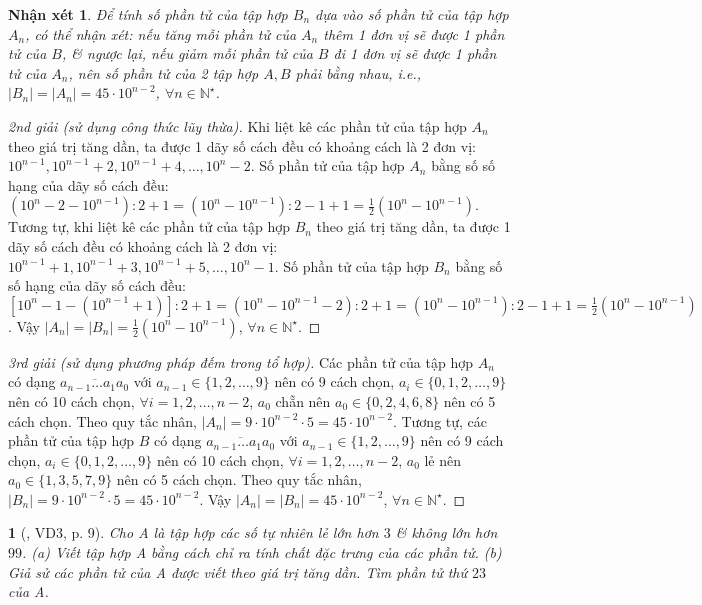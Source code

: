\documentclass{article}
\newtheorem{baitoan}{}
\newtheorem{nhanxet}{Nhận xét}
\begin{document}
\begin{nhanxet}
	Để tính số phần tử của tập hợp $B_n$ dựa vào số phần tử của tập hợp $A_n$, có thể nhận xét: nếu tăng mỗi phần tử của $A_n$ thêm 1 đơn vị sẽ được 1 phần tử của $B$, \& ngược lại, nếu giảm mỗi phần tử của $B$ đi 1 đơn vị sẽ được 1 phần tử của $A_n$, nên số phần tử của 2 tập hợp $A,B$ phải bằng nhau, i.e., $|B_n| = |A_n| = 45\cdot10^{n-2}$, $\forall n\in\mathbb{N}^\star$.
\end{nhanxet}

\begin{proof}[2nd giải (sử dụng công thức lũy thừa)]
	Khi liệt kê các phần tử của tập hợp $A_n$ theo giá trị tăng dần, ta được 1 dãy số cách đều có khoảng cách là 2 đơn vị: $10^{n-1},10^{n-1} + 2,10^{n-1} + 4,\ldots,10^n - 2$. Số phần tử của tập hợp $A_n$ bằng số số hạng của dãy số cách đều: $(10^n - 2 - 10^{n-1}):2 + 1 = (10^n - 10^{n-1}):2 - 1 + 1 = \frac{1}{2}(10^n - 10^{n-1})$. Tương tự, khi liệt kê các phần tử của tập hợp $B_n$ theo giá trị tăng dần, ta được 1 dãy số cách đều có khoảng cách là 2 đơn vị: $10^{n-1} + 1,10^{n-1} + 3,10^{n-1} + 5,\ldots,10^n - 1$. Số phần tử của tập hợp $B_n$ bằng số số hạng của dãy số cách đều: $[10^n - 1 - (10^{n-1} + 1)]:2 + 1 = (10^n - 10^{n-1} - 2):2 + 1 = (10^n - 10^{n-1}):2 - 1 + 1 = \frac{1}{2}(10^n - 10^{n-1})$. Vậy $|A_n| = |B_n| = \frac{1}{2}(10^n - 10^{n-1})$, $\forall n\in\mathbb{N}^\star$.
\end{proof}

\begin{proof}[3rd giải (sử dụng phương pháp đếm trong tổ hợp)]
	Các phần tử của tập hợp $A_n$ có dạng $\overline{a_{n-1}\ldots a_1a_0}$ với $a_{n-1}\in\{1,2,\ldots,9\}$ nên có 9 cách chọn, $a_i\in\{0,1,2,\ldots,9\}$ nên có 10 cách chọn, $\forall i = 1,2,\ldots,n - 2$, $a_0$ chẵn nên $a_0\in\{0,2,4,6,8\}$ nên có 5 cách chọn. Theo quy tắc nhân, $|A_n| = 9\cdot10^{n-2}\cdot5 = 45\cdot10^{n-2}$. Tương tự, các phần tử của tập hợp $B$ có dạng $\overline{a_{n-1}\ldots a_1a_0}$ với $a_{n-1}\in\{1,2,\ldots,9\}$ nên có 9 cách chọn, $a_i\in\{0,1,2,\ldots,9\}$ nên có 10 cách chọn, $\forall i = 1,2,\ldots,n - 2$, $a_0$ lẻ nên $a_0\in\{1,3,5,7,9\}$ nên có 5 cách chọn. Theo quy tắc nhân, $|B_n| = 9\cdot10^{n-2}\cdot5 = 45\cdot10^{n-2}$. Vậy $|A_n| = |B_n| = 45\cdot10^{n-2}$, $\forall n\in\mathbb{N}^\star$.
\end{proof}

\begin{baitoan}[\cite{Binh_boi_duong_Toan_6_tap_1}, VD3, p. 9]
	Cho A là tập hợp các số tự nhiên lẻ lớn hơn $3$ \& không lớn hơn $99$. (a) Viết tập hợp A bằng cách chỉ ra tính chất đặc trưng của các phần tử. (b) Giả sử các phần tử của A được viết theo giá trị tăng dần. Tìm phần tử thứ $23$ của A.
\end{baitoan}
\end{document}
